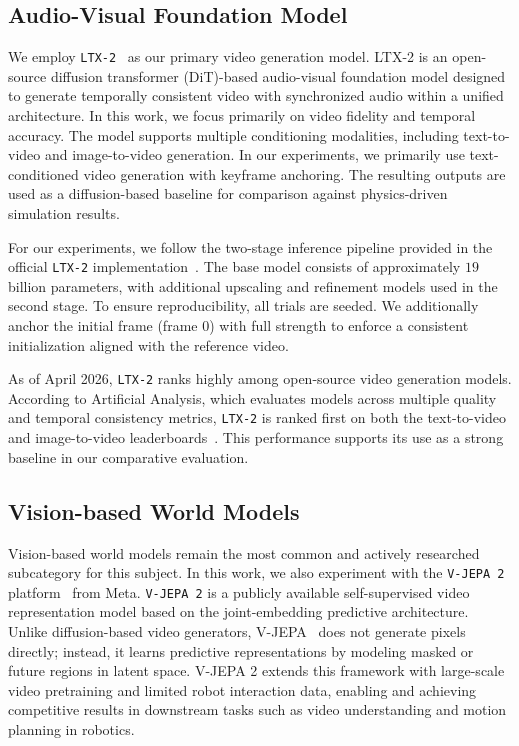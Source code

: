 \documentclass{article}
\begin{document}
\subsection{Audio-Visual Foundation Model}
We employ \texttt{LTX-2}~\cite{hacohen2026ltx} as our primary video generation model. 
LTX-2 is an open-source diffusion transformer (DiT)-based audio-visual foundation model designed to generate temporally consistent video with synchronized audio within a unified architecture. In this work, we focus primarily on video fidelity and temporal accuracy.
The model supports multiple conditioning modalities, including text-to-video and image-to-video generation. In our experiments, we primarily use text-conditioned video generation with keyframe anchoring. The resulting outputs are used as a diffusion-based baseline for comparison against physics-driven simulation results.

For our experiments, we follow the two-stage inference pipeline provided in the official \texttt{LTX-2} implementation~\cite{ltx2_hf}. The base model consists of approximately $19$ billion parameters, with additional upscaling and refinement models used in the second stage. To ensure reproducibility, all trials are seeded. We additionally anchor the initial frame (frame $0$) with full strength to enforce a consistent initialization aligned with the reference video.

As of April 2026, \texttt{LTX-2} ranks highly among open-source video generation models. According to Artificial Analysis, which evaluates models across multiple quality and temporal consistency metrics, \texttt{LTX-2} is ranked first on both the text-to-video and image-to-video leaderboards~\cite{artificialanalysis_t2v,artificialanalysis_i2v}. This performance supports its use as a strong baseline in our comparative evaluation. 

\subsection{Vision-based World Models}
Vision-based world models remain the most common and actively researched subcategory for this subject. In this work, we also experiment with the \texttt{V-JEPA 2} platform~\cite{assran2025v} from Meta. \texttt{V-JEPA 2} is a publicly available self-supervised video representation model based on the joint-embedding predictive architecture. Unlike diffusion-based video generators, V-JEPA~\cite{bardes2024revisiting} does not generate pixels directly; instead, it learns predictive representations by modeling masked or future regions in latent space. V-JEPA 2 extends this framework with large-scale video pretraining and limited robot interaction data, enabling and achieving competitive results in downstream tasks such as video understanding and motion planning in robotics. 
\end{document}
